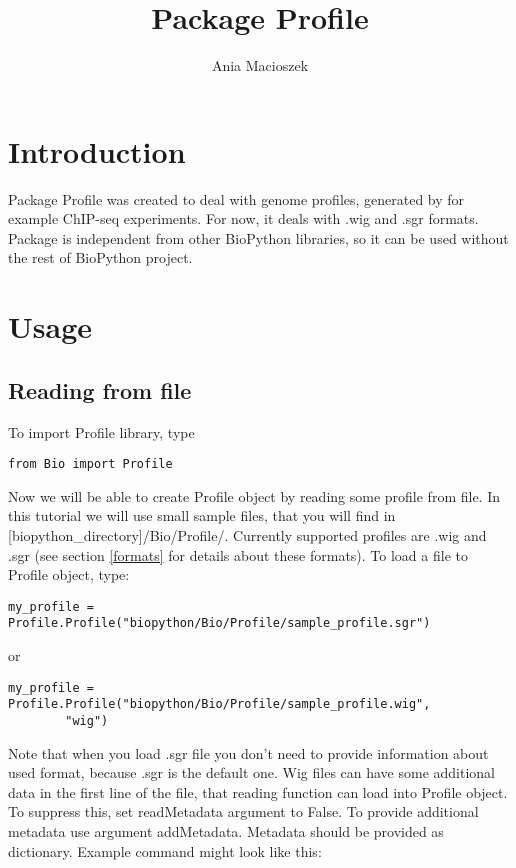 \documentclass[a4paper,11pt,portrait]{article}
\title{Package Profile}
\author{Ania Macioszek}
\date{}
\begin{document}
\maketitle

\section{Introduction}

Package Profile was created to deal with genome profiles,
generated by for example ChIP-seq experiments.
For now, it deals with .wig and .sgr formats.
Package is independent from other BioPython libraries,
so it can be used without the rest of BioPython project.


\section{Usage}

\subsection{Reading from file}

To import Profile library, type

\begin{verbatim}
from Bio import Profile
\end{verbatim}

Now we will be able to create Profile object
by reading some profile from file.
In this tutorial we will use small sample files,
that you will find in [biopython\_directory]/Bio/Profile/.
Currently supported profiles are .wig and .sgr
(see section \ref{formats} for details about these formats).
To load a file to Profile object, type:

\begin{verbatim}
my_profile = Profile.Profile("biopython/Bio/Profile/sample_profile.sgr")
\end{verbatim}

or

\begin{verbatim}
my_profile = Profile.Profile("biopython/Bio/Profile/sample_profile.wig",
		"wig")
\end{verbatim}

Note that when you load .sgr file you don't need to provide information about used format,
because .sgr is the default one.
Wig files can have some additional data in the first line of the file,
that reading function can load into Profile object.
To suppress this, set readMetadata argument to False.
To provide additional metadata use argument addMetadata.
Metadata should be provided as dictionary.
Example command might look like this:
\end{document}
